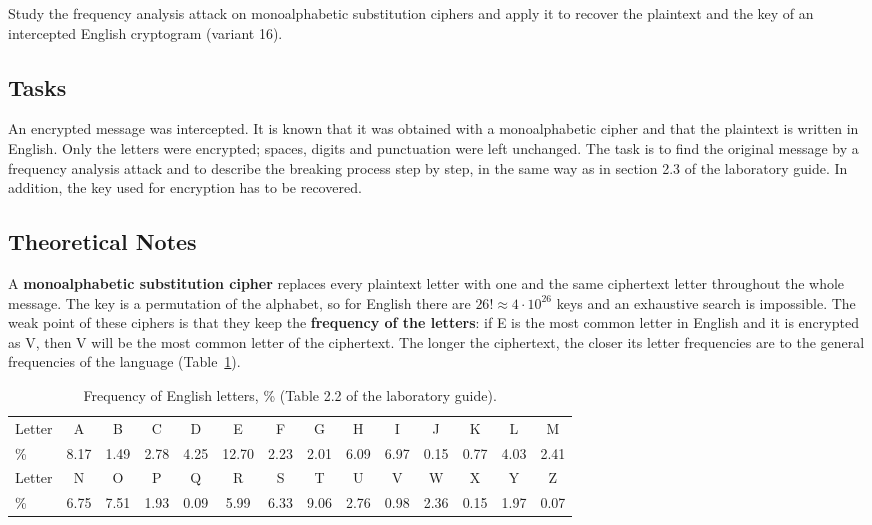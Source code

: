 \documentclass[12pt,a4paper]{article}
\begin{document}
Study the frequency analysis attack on monoalphabetic substitution ciphers and apply it
to recover the plaintext and the key of an intercepted English cryptogram (variant 16).

\subsection{Tasks}

An encrypted message was intercepted. It is known that it was obtained with a
monoalphabetic cipher and that the plaintext is written in English. Only the letters were
encrypted; spaces, digits and punctuation were left unchanged. The task is to find the
original message by a frequency analysis attack and to describe the breaking process step
by step, in the same way as in section 2.3 of the laboratory guide. In addition, the key
used for encryption has to be recovered.

\subsection{Theoretical Notes}

A \textbf{monoalphabetic substitution cipher} replaces every plaintext letter with one and
the same ciphertext letter throughout the whole message. The key is a permutation of the
alphabet, so for English there are $26! \approx 4 \cdot 10^{26}$ keys and an exhaustive
search is impossible. The weak point of these ciphers is that they keep the
\textbf{frequency of the letters}: if E is the most common letter in English and it is
encrypted as V, then V will be the most common letter of the ciphertext. The longer the
ciphertext, the closer its letter frequencies are to the general frequencies of the
language (Table~\ref{tab:english}).

\begin{table}[H]
  \centering
  \caption{Frequency of English letters, \% (Table 2.2 of the laboratory guide).}
  \label{tab:english}
  \setlength{\tabcolsep}{3.2pt}
  \small
  \begin{tabular}{l*{13}{c}}
    \toprule
    Letter & A & B & C & D & E & F & G & H & I & J & K & L & M \\
    \%     & 8.17 & 1.49 & 2.78 & 4.25 & 12.70 & 2.23 & 2.01 & 6.09 & 6.97 & 0.15 & 0.77 & 4.03 & 2.41 \\
    \midrule
    Letter & N & O & P & Q & R & S & T & U & V & W & X & Y & Z \\
    \%     & 6.75 & 7.51 & 1.93 & 0.09 & 5.99 & 6.33 & 9.06 & 2.76 & 0.98 & 2.36 & 0.15 & 1.97 & 0.07 \\
    \bottomrule
  \end{tabular}
\end{table}
\end{document}
